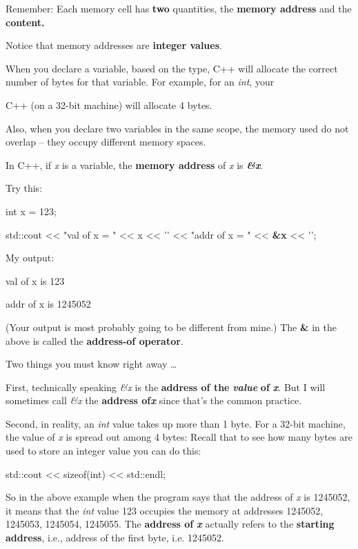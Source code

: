 Remember: Each memory cell has \textbf{two} quantities, the \textbf{memory address} and the \textbf{content.}

Notice that memory addresses are \textbf{integer values}.

When you declare a variable, based on the type, C++ will allocate the correct number of bytes for that variable. For example, for an \emph{int}, your

C++ (on a 32-bit machine) will allocate 4 bytes.

Also, when you declare two variables in the same scope, the memory used do not overlap -- they occupy different memory spaces.

\newpage{}

In C++, if \emph{x} is a variable, the \textbf{memory address} of \emph{x} is \emph{\textbf{\&x}}.

Try this:

\begin{consolethree}[escapeinside=||]
int x = 123;

std::cout << "val of x = " << x << '\n'
          << "addr of x = " << \textbf{\&x} << '\n';
\end{consolethree}

My output:

\begin{consolethree}[escapeinside=||]
val of x is 123

addr of x is 1245052
\end{consolethree}
(Your output is most probably going to be different from mine.) The \textbf{\&} in the above is called the \textbf{address-of operator}.

Two things you must know right away \ldots{}

First, technically speaking \emph{\&x} is the \textbf{address of the }\emph{\textbf{value}}\textbf{ of }\emph{\textbf{x}}. But I will sometimes call \emph{\&x} the \textbf{address of}\emph{\textbf{x}} since that's the common practice.

Second, in reality, an \emph{int} value takes up more than 1 byte. For a 32-bit machine, the value of \emph{x} is spread out among 4 bytes: Recall that to see how many bytes are used to store an integer value you can do this:

\begin{consolethree}[escapeinside=||]
std::cout << sizeof(int)
          << std::endl;
\end{consolethree}
So in the above example when the program says that the address of \emph{x} is 1245052, it means that the \emph{int} value 123 occupies the memory at addresses 1245052, 1245053, 1245054, 1245055. The \textbf{address of }\emph{\textbf{x}} actually refers to the \textbf{starting address}, i.e., address of the first byte, i.e. 1245052.

